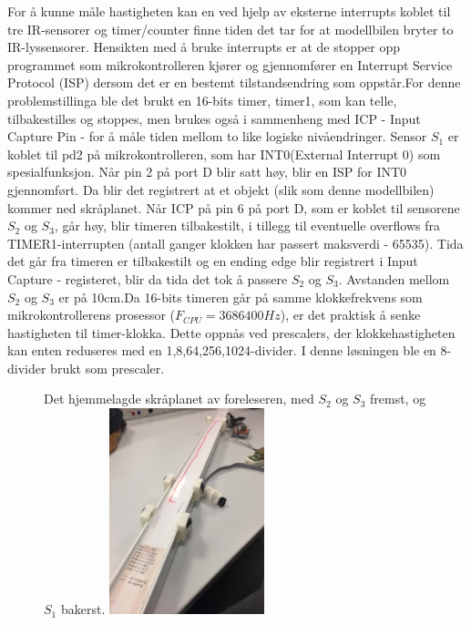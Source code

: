 \documentclass[11pt, a4paper]{report}
\begin{document}
For å kunne måle hastigheten kan en ved hjelp av eksterne interrupts koblet til tre IR-sensorer og timer/counter finne tiden det tar for at modellbilen bryter to IR-lyssensorer.
Hensikten med å bruke interrupts er at de stopper opp programmet som mikrokontrolleren kjører og gjennomfører en Interrupt Service Protocol (ISP) dersom det er en bestemt tilstandsendring som oppstår.\newline For denne problemstillinga ble det brukt en 16-bits timer, timer1, som kan telle, tilbakestilles og stoppes, men brukes også i sammenheng med ICP - Input Capture Pin - for å måle tiden mellom to like logiske nivåendringer. 
Sensor $S_{1}$ er koblet til pd2 på mikrokontrolleren, som har INT0(External Interrupt 0) som spesialfunksjon. Når pin 2 på port D blir satt høy, blir en ISP for INT0 gjennomført. Da blir det registrert at et objekt (slik som denne modellbilen) kommer ned skråplanet. Når ICP på pin 6 på port D, som er koblet til sensorene $S_{2}$ og $S_{3}$, går høy, blir timeren tilbakestilt, i tillegg til eventuelle overflows fra TIMER1-interrupten (antall ganger klokken har passert maksverdi - 65535). Tida det går fra timeren er tilbakestilt og en ending edge blir registrert i Input Capture - registeret, blir da tida det tok å passere $S_{2}$ og $S_{3}$. Avstanden mellom $S_{2}$ og $S_{3}$ er på 10cm.\newline Da 16-bits timeren går på samme klokkefrekvens som mikrokontrollerens prosessor ($F_{CPU} = 3686400 Hz$), er det praktisk å senke hastigheten til timer-klokka. Dette oppnås ved prescalers, der klokkehastigheten kan enten reduseres med en 1,8,64,256,1024-divider. I denne løsningen ble en 8-divider brukt som prescaler.

\begin{figure}
  \centering
  \captionbox
  {Det hjemmelagde skråplanet av foreleseren, med $S_{2}$ og $S_{3}$ fremst, og $S_{1}$ bakerst.}
  {\includegraphics[width=0.4\textwidth, right]{field.jpg}}
\end{figure}
\end{document}
